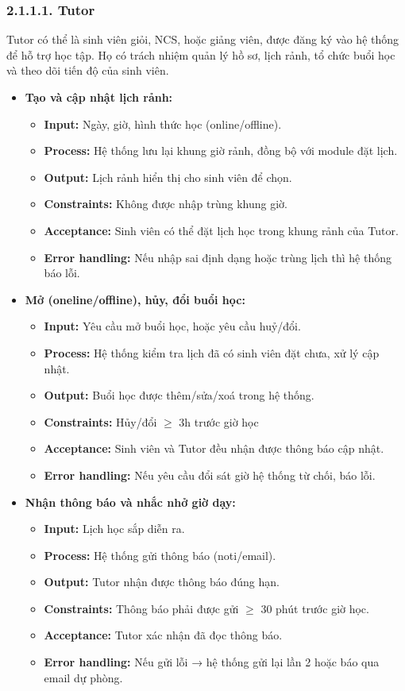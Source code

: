 \subsubsection*{2.1.1.1. Tutor}
Tutor có thể là sinh viên giỏi, NCS, hoặc giảng viên, được đăng ký vào hệ thống để hỗ trợ học tập. Họ có trách nhiệm quản lý hồ sơ, lịch rảnh, tổ chức buổi học và theo dõi tiến độ của sinh viên.
\begin{itemize}
    \item \textbf{Tạo và cập nhật lịch rảnh:}
    \begin{itemize}
        \item \textbf{Input:} Ngày, giờ, hình thức học (online/offline).
        \item \textbf{Process:} Hệ thống lưu lại khung giờ rảnh, đồng bộ với module đặt lịch.
        \item \textbf{Output:} Lịch rảnh hiển thị cho sinh viên để chọn.
        \item \textbf{Constraints:} Không được nhập trùng khung giờ.
        \item \textbf{Acceptance:} Sinh viên có thể đặt lịch học trong khung rảnh của Tutor.
        \item \textbf{Error handling:} Nếu nhập sai định dạng hoặc trùng lịch thì hệ thống báo lỗi.
    \end{itemize}
    
    \item \textbf{Mở (oneline/offline), hủy, đổi buổi học:}
    \begin{itemize}
        \item \textbf{Input:} Yêu cầu mở buổi học, hoặc yêu cầu huỷ/đổi.
        \item \textbf{Process:} Hệ thống kiểm tra lịch đã có sinh viên đặt chưa, xử lý cập nhật.
        \item \textbf{Output:} Buổi học được thêm/sửa/xoá trong hệ thống.
        \item \textbf{Constraints:} Hủy/đổi $\geq$ 3h trước giờ học
        \item \textbf{Acceptance:} Sinh viên và Tutor đều nhận được thông báo cập nhật.
        \item \textbf{Error handling:} Nếu yêu cầu đổi sát giờ hệ thống từ chối, báo lỗi.
    \end{itemize}
    
    \item \textbf{Nhận thông báo và nhắc nhở giờ dạy:}
    \begin{itemize}
        \item \textbf{Input:} Lịch học sắp diễn ra.
        \item \textbf{Process:} Hệ thống gửi thông báo (noti/email).
        \item \textbf{Output:} Tutor nhận được thông báo đúng hạn.
        \item \textbf{Constraints:} Thông báo phải được gửi $\geq$ 30 phút trước giờ học.
        \item \textbf{Acceptance:} Tutor xác nhận đã đọc thông báo.
        \item \textbf{Error handling:} Nếu gửi lỗi → hệ thống gửi lại lần 2 hoặc báo qua email dự phòng.
    \end{itemize}
    

\end{itemize}
